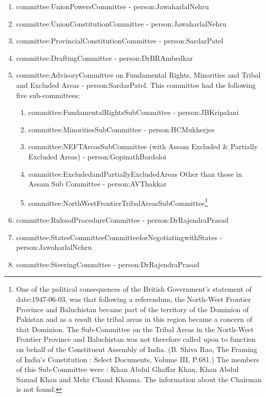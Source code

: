 \begin{enumerate}
  \item \gls{committee:UnionPowersCommittee} - \gls{person:JawaharlalNehru}
  \item \gls{committee:UnionConstitutionCommittee} - \gls{person:JawaharlalNehru}
  \item \gls{committee:ProvincialConstitutionCommittee} - \gls{person:SardarPatel}
  \item \gls{committee:DraftingCommittee} - \gls{person:DrBRAmbedkar}
  \item \gls{committee:AdvisoryCommittee} on Fundamental Rights, Minorities and Tribal and Excluded Areas - \gls{person:SardarPatel}. This committee had the following five sub-committees:
  \begin{enumerate}
    \item \gls{committee:FundamentalRightsSubCommittee} - \gls{person:JBKripalani}
    \item \gls{committee:MinoritiesSubCommittee} - \gls{person:HCMukherjee}
    \item \gls{committee:NEFTAreasSubCommittee} (with Assam Excluded \& Partially Excluded Areas) - \gls{person:GopinathBardoloi}
    \item \gls{committee:ExcludedandPartiallyExcludedAreas} Other than those in Assam Sub Committee - \gls{person:AVThakkar}
    \item \gls{committee:NorthWestFrontierTribalAreasSubCommittee}\footnote{One of the political consequences of the British Government’s statement of \gls{date:1947-06-03}, was that following a referendum, the North-West Frontier Province and Baluchistan became part of the territory of the Dominion of Pakistan and as a result the tribal areas in this region became a concern of that Dominion. The Sub-Committee on the Tribal Areas in the North-West Frontier Province and Baluchistan was not therefore called upon to function on behalf of the Constituent Assembly of India. (B. Shiva Rao, The Framing of India’s Constitution : Select Documents, Volume III, P.681.) The members of this Sub-Committee were : Khan Abdul Ghaffar Khan, Khan Abdul Samad Khan and Mehr Chand Khanna. The information about the Chairman is not found.}
  \end{enumerate}
  
  \item \gls{committee:RulesofProcedureCommittee} - \gls{person:DrRajendraPrasad}
  \item \gls{committee:StatesCommitteeCommitteeforNegotiatingwithStates} - \gls{person:JawaharlalNehru}
  \item \gls{committee:SteeringCommittee} - \gls{person:DrRajendraPrasad}
\end{enumerate}

